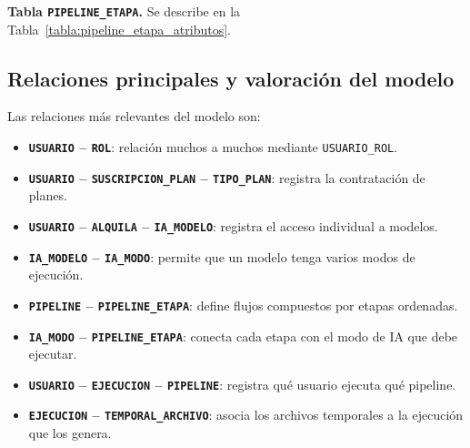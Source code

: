 
\medskip

\noindent\textbf{Tabla \texttt{PIPELINE\_ETAPA}.} Se describe en la Tabla~\ref{tabla:pipeline_etapa_atributos}.



\subsection{Relaciones principales y valoración del modelo}

\begingroup
\small
Las relaciones más relevantes del modelo son:

\begin{itemize}
	\setlength{\itemsep}{0.25em}
	\setlength{\parsep}{0pt}
	\item \textbf{\texttt{USUARIO} -- \texttt{ROL}}: relación muchos a muchos mediante \texttt{USUARIO\_ROL}.
	\item \textbf{\texttt{USUARIO} -- \texttt{SUSCRIPCION\_PLAN} -- \texttt{TIPO\_PLAN}}: registra la contratación de planes.
	\item \textbf{\texttt{USUARIO} -- \texttt{ALQUILA} -- \texttt{IA\_MODELO}}: registra el acceso individual a modelos.
	\item \textbf{\texttt{IA\_MODELO} -- \texttt{IA\_MODO}}: permite que un modelo tenga varios modos de ejecución.
	\item \textbf{\texttt{PIPELINE} -- \texttt{PIPELINE\_ETAPA}}: define flujos compuestos por etapas ordenadas.
	\item \textbf{\texttt{IA\_MODO} -- \texttt{PIPELINE\_ETAPA}}: conecta cada etapa con el modo de IA que debe ejecutar.
	\item \textbf{\texttt{USUARIO} -- \texttt{EJECUCION} -- \texttt{PIPELINE}}: registra qué usuario ejecuta qué pipeline.
	\item \textbf{\texttt{EJECUCION} -- \texttt{TEMPORAL\_ARCHIVO}}: asocia los archivos temporales a la ejecución que los genera.
\end{itemize}

